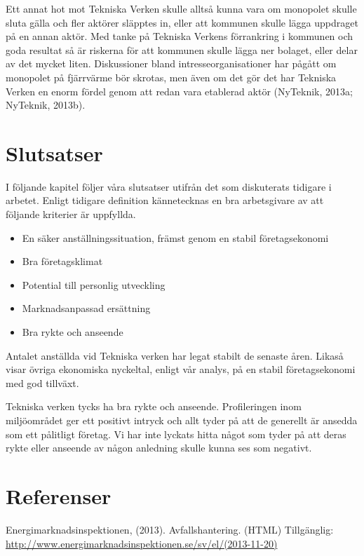 \documentclass[10pt,a4paper]{article}
\begin{document}
Ett annat hot mot Tekniska Verken skulle alltså kunna vara om monopolet
skulle sluta gälla och fler aktörer släpptes in, eller att kommunen
skulle lägga uppdraget på en annan aktör. Med tanke på Tekniska Verkens förrankring i kommunen
och goda resultat så är riskerna för att kommunen skulle lägga ner
bolaget, eller delar av det mycket liten. Diskussioner bland
intresseorganisationer har pågått om
monopolet på fjärrvärme bör skrotas, men även om det gör det har
Tekniska Verken en enorm fördel genom att redan vara etablerad aktör
(NyTeknik, 2013a; NyTeknik, 2013b).


\section{Slutsatser}
I följande kapitel följer våra slutsatser utifrån det som diskuterats tidigare i
arbetet. Enligt tidigare definition kännetecknas en bra arbetsgivare av att 
följande kriterier är uppfyllda.

\begin{itemize}
 \item En säker anställningssituation, främst genom en stabil företagsekonomi 
 \item Bra företagsklimat
 \item Potential till personlig utveckling
 \item Marknadsanpassad ersättning
 \item Bra rykte och anseende
\end{itemize}

Antalet anställda vid Tekniska verken har legat stabilt de senaste åren. Likaså
visar övriga ekonomiska nyckeltal, enligt vår analys, på en stabil
företagsekonomi med god tillväxt.

Tekniska verken tycks ha bra rykte och anseende. Profileringen inom miljöområdet
ger ett positivt intryck och allt tyder på att de generellt är ansedda som ett
pålitligt företag. Vi har inte lyckats hitta något som tyder på att deras rykte
eller anseende av någon anledning skulle kunna ses som negativt.

\newpage
\section{Referenser}


\hspace{0,5cm}Energimarknadsinspektionen, (2013). Avfallshantering. (HTML) Tillgänglig: \\
\hyperref{http://www.energimarknadsinspektionen.se/sv/el/}{}{}{http://www.energimarknadsinspektionen.se/sv/el/(2013-11-20)}\\
\end{document}

